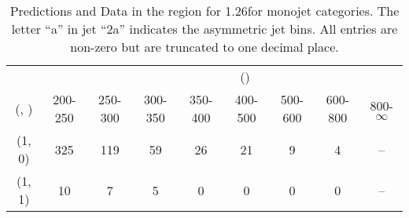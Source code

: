 \begin{table}[h!]
\tiny
\centering
\caption{Predictions and Data in the \mmj region for 1.26\ifb for monojet categories. The letter ``a'' in jet \eg ``2a''  indicates the asymmetric jet bins. All entries are non-zero but are truncated to one decimal place.\label{tab:yieldsseppost_mumu_data_mono}}
\begin{tabular}
{ccccccccc}
	\hline\hline
&	& \multicolumn{8}{c}{\scalht (\gev)} \\ 
	 (\njet,  \nb) & 200-250 & 250-300 & 300-350 & 350-400 & 400-500 & 500-600 & 600-800 & 800-$\infty$ \\ [0.8ex] 
\hline
	(1, 0) & 325 & 119 & 59 & 26 & 21 & 9 & 4 & -- \\[0.5ex] 
	(1, 1) & 10 & 7 & 5 & 0 & 0 & 0 & 0 & -- \\[0.5ex] 
	\hline
	\hline
\end{tabular}
\end{table}

